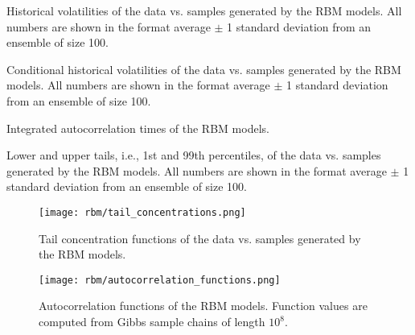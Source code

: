 \begin{table}[ht]
    \centering
    \begin{adjustbox}{max width=\textwidth}
        
    \end{adjustbox}
    \caption{Historical volatilities of the data vs. samples generated by the RBM models. All numbers are shown in the format average \(\pm\) 1 standard deviation from an ensemble of size 100.}
    \label{tbl:rbm_volatilities}
\end{table}

\begin{table}[ht]
    \centering
    \begin{adjustbox}{max width=\textwidth}
        
    \end{adjustbox}
    \caption{Conditional historical volatilities of the data vs. samples generated by the RBM models. All numbers are shown in the format average \(\pm\) 1 standard deviation from an ensemble of size 100.}
    \label{tbl:rbm_conditional_volatilities}
\end{table}

\begin{table}[ht]
    \centering
    \begin{adjustbox}{max width=\textwidth}
        
    \end{adjustbox}
    \caption{Integrated autocorrelation times of the RBM models.}
    \label{tbl:rbm_ac_times}
\end{table}

\begin{table}[ht]
    \centering
    \begin{adjustbox}{max width=\textwidth}
        
    \end{adjustbox}
    \caption{Lower and upper tails, i.e., 1st and 99th percentiles, of the data vs. samples generated by the RBM models. All numbers are shown in the format average \(\pm\) 1 standard deviation from an ensemble of size 100.}
    \label{tbl:rbm_tails}
\end{table}

\begin{figure}[ht]
    \begin{center}
        \texttt{[image: rbm/tail\_concentrations.png]}
    \end{center}
    \caption{Tail concentration functions of the data vs. samples generated by the RBM models.}
    \label{fig:rbm_tail_concentrations}
\end{figure}

\begin{figure}[ht]
    \begin{center}
        \texttt{[image: rbm/autocorrelation\_functions.png]}
    \end{center}
    \caption{Autocorrelation functions of the RBM models. Function values are computed from Gibbs sample chains of length \( 10^8 \).}
    \label{fig:rbm_autocorrelation_functions}
\end{figure}
